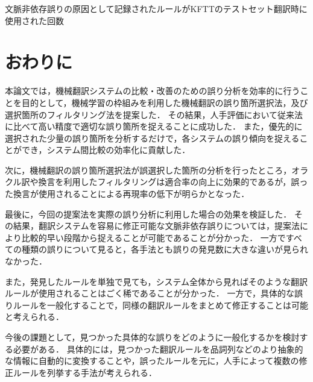 \documentclass[japanese]{jnlp_1.4}
\newcommand{\textcolor}[2]{}
\begin{document}
\begin{table}[t]
\caption{文脈非依存誤りの原因として記録されたルールがKFTTのテストセット翻訳時に使用された回数}
\label{tab:stat-indepcover}

\end{table}


\section{おわりに}
\label{sec:conclusion}

本論文では，機械翻訳システムの比較・改善のための誤り分析を効率的に行うことを目的として，機械学習の枠組みを利用した機械翻訳の誤り箇所選択法，及び選択箇所のフィルタリング法を提案した．
その結果，人手評価において従来法に比べて高い精度で適切な誤り箇所を捉えることに成功した．
また，優先的に選択された少量の誤り箇所を分析するだけで，各システムの誤り傾向を捉えることができ，システム間比較の効率化に貢献した．


次に，機械翻訳の誤り箇所選択法が誤選択した箇所の分析を行ったところ，オラクル訳や換言を利用したフィルタリングは適合率の向上に効果的であるが，誤った換言が使用されることによる再現率の低下が明らかとなった．

最後に，今回の提案法を実際の誤り分析に利用した場合の効果を検証した．
その結果，翻訳システムを容易に修正可能な文脈非依存誤りについては，提案法により比較的早い段階から捉えることが可能であることが分かった．
一方ですべての種類の誤りについて見ると，各手法とも誤りの発見数に大きな違いが見られなかった．
\textcolor{black}{この理由として，各手法によって選択された誤り箇所の特徴が挙げられる．
誤り頻度に基づき選択された誤り箇所は，識別言語モデルの重みに基づいて選択された箇所に比べ，目的言語に頻繁に出現する$n$-gramを多く含む．
このため，識別言語モデルの重みに基づく手法を利用した際，誤り分析者が比較的効率良く選択箇所に目を通すことができたと考えられる．
今回の実験では，目を通した文の数については記録を行っていないため，今後の調査項目として検討する必要がある．
}

また，発見したルールを単独で見ても，システム全体から見ればそのような翻訳ルールが使用されることはごく稀であることが分かった．
一方で，具体的な誤りルールを一般化することで，同様の翻訳ルールをまとめて修正することは可能と考えられる．

今後の課題として，見つかった具体的な誤りをどのように一般化するかを検討する必要がある．
具体的には，見つかった翻訳ルールを品詞列などのより抽象的な情報に自動的に変換することや，誤ったルールを元に，人手によって複数の修正ルールを列挙する手法が考えられる．


\acknowledgment
\end{document}
